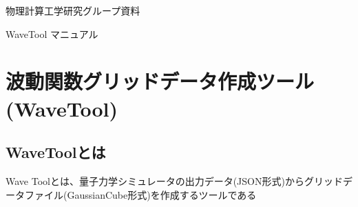 \documentclass{jsarticle}
\begin{document}
\begin{flushright} 
物理計算工学研究グループ資料 
\end{flushright}

\begin{center}
\Huge{WaveTool マニュアル}
\end{center}

  \setcounter{page}{0}
  \tableofcontents
  \listoffigures	
\newpage
{}


\section{波動関数グリッドデータ作成ツール(WaveTool)}
	\label{sec:wavetool}

\subsection{WaveToolとは}
Wave Toolとは、量子力学シミュレータの出力データ(JSON形式)からグリッドデータファイル(GaussianCube形式)を作成するツールである




\end{document}
